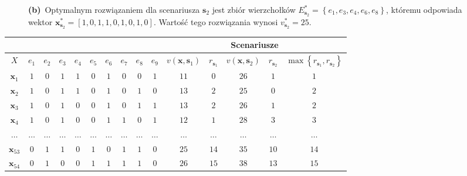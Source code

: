 \begin{figure}[!htbp]
{		\textbf{(b)}~Optymalnym rozwiązaniem dla scenariusza $\textbf{s}_{2}$ jest zbiór wierzchołków $E^{\ast}_{\textbf{s}_{2}} = \left\{ e_{1}, e_{3}, e_{4}, e_{6}, e_{8} \right\}$, któremu odpowiada wektor $\textbf{x}^{\ast}_{\textbf{s}_{2}} = \left[ 1, 0, 1, 1, 0, 1, 0, 1, 0 \right]$. Wartość tego rozwiązania wynosi $v^{\ast}_{\textbf{s}_{2}} = 25$.
	}
	\label{fig:minmaxregexample}
\end{figure}

\begin{table}[!htbp]
	\centering
	\begin{tabular}{ccccccccccccccc}
		\cline{11-15}
		\multicolumn{2}{c}{}       &         &         &         &         &         &         &         &         & \multicolumn{5}{c}{Scenariusze}                                                                                                                                                                                             \\ \hline
		$X$              & $e_{1}$ & $e_{2}$ & $e_{3}$ & $e_{4}$ & $e_{5}$ & $e_{6}$ & $e_{7}$ & $e_{8}$ & $e_{9}$ & $v \left( \textbf{x}, \textbf{s}_{1} \right) $ & $r_{\textbf{s}_{1}}$  & $v \left( \textbf{x}, \textbf{s}_{2} \right) $ &  $r_{\textbf{s}_{2}}$ & $\max \left\{ r_{\textbf{s}_{1}}, r_{\textbf{s}_{2}} \right\} $ \\ \hline
		$\textbf{x}_{1}$ & $1$     & $0$     & $1$     & $1$     & $0$     & $1$     & $0$     & $0$	&	$1$	&	$11$	&	$0$	&	$26$	&	$1$	&	$1$	\\
		$\textbf{x}_{2}$ & $1$     & $0$     & $1$     & $1$     & $0$     & $1$     & $0$     & $1$	&	$0$	&	$13$	&	$2$	&	$25$	&	$0$	&	$2$	\\
		$\textbf{x}_{3}$ & $1$     & $0$     & $1$     & $0$     & $0$     & $1$     & $0$     & $1$	&	$1$	&	$13$	&	$2$	&	$26$	&	$1$	&	$2$	\\
		$\textbf{x}_{4}$ & $1$     & $0$     & $1$     & $0$     & $0$     & $1$     & $1$     & $0$	&	$1$	&	$12$	&	$1$	&	$28$	&	$3$	&	$3$	\\
		$\dots$ & $\dots$     & $\dots$     & $\dots$     & $\dots$     & $\dots$     & $\dots$     & $\dots$     & $\dots$	&	$\dots$	&	$\dots$	&	$\dots$	&	$\dots$	&	$\dots$	&	$\dots$	\\
		$\textbf{x}_{53}$ & $0$     & $1$     & $1$     & $0$     & $1$     & $0$     & $1$     & $1$	&	$0$	&	$25$	&	$14$	&	$35$	&	$10$	&	$14$	\\
		$\textbf{x}_{54}$ & $0$     & $1$     & $0$     & $0$     & $1$     & $1$     & $1$     & $1$	&	$0$	&	$26$	&	$15$	&	$38$	&	$13$	&	$15$	\\

\end{tabular}
\end{table}
